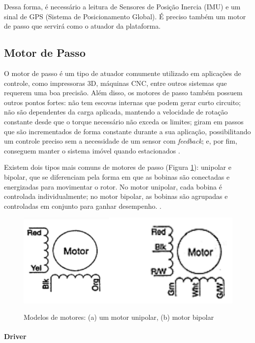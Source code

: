 Dessa forma, é necessário a leitura de Sensores de Posição Inercia (IMU) e um sinal de GPS (Sistema de Posicionamento Global). É preciso também um motor de passo que servirá como o atuador da plataforma.

\subsection{Motor de Passo}

O motor de passo é um tipo de atuador comumente utilizado em aplicações de controle, como impressoras 3D, máquinas CNC, entre outros sistemas que requerem uma boa precisão. Além disso, os motores de passo também possuem outros pontos fortes: não tem escovas internas que podem gerar curto circuito; não são dependentes da carga aplicada, mantendo a velocidade de rotação constante desde que o torque necessário não exceda os limites; giram em passos que são incrementados de forma constante durante a sua aplicação, possibilitando um controle preciso sem a necessidade de um sensor com \textit{feedback}; e, por fim, conseguem manter o sistema imóvel quando estacionados \cite{manual:stepperMicrochip}.

Existem dois tipos mais comuns de motores de passo (Figura \ref{fig:stepper_polar}): unipolar e bipolar, que se diferenciam pela forma em que as bobinas são conectadas e energizadas para movimentar o rotor. No motor unipolar, cada bobina é controlada individualmente; no motor bipolar, as bobinas são agrupadas e controladas em conjunto para ganhar desempenho. \cite{man:advancedmicrosystemStepControl}.

\begin{figure}[!htb]
	\centering
	\caption{Modelos de motores: (a) um motor unipolar, (b) motor bipolar}
	\includegraphics[width=.7\linewidth]{figuras/stepper_polar}
	\label{fig:stepper_polar}
\end{figure}

\paragraph{Driver}

